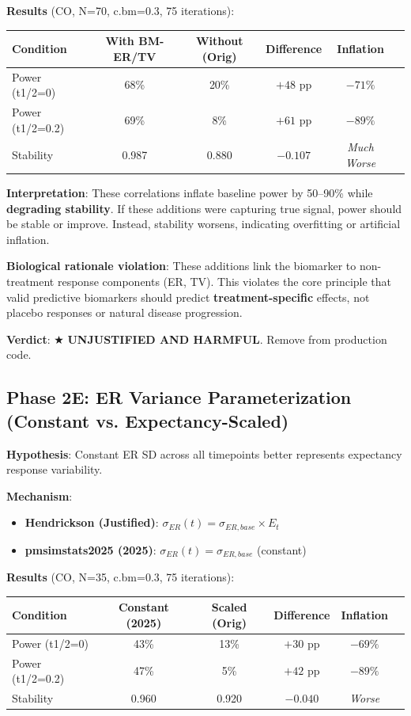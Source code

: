\documentclass[12pt,a4paper]{article}
\begin{document}
\textbf{Results} (CO, N=70, c.bm=0.3, 75 iterations):

\begin{center}
\begin{tabular}{lccccc}
\toprule
\textbf{Condition} & \textbf{With BM-ER/TV} & \textbf{Without (Orig)} & \textbf{Difference} & \textbf{Inflation} \\
\midrule
Power (t1/2=0) & 68\% & 20\% & $+48$ pp & $-71\%$ \\
Power (t1/2=0.2) & 69\% & 8\% & $+61$ pp & $-89\%$ \\
Stability & 0.987 & 0.880 & $-0.107$ & \textit{Much Worse} \\
\bottomrule
\end{tabular}
\end{center}

\textbf{Interpretation}: These correlations inflate baseline power by 50--90\% while \textbf{degrading stability}. If these additions were capturing true signal, power should be stable or improve. Instead, stability worsens, indicating overfitting or artificial inflation.

\textbf{Biological rationale violation}: These additions link the biomarker to non-treatment response components (ER, TV). This violates the core principle that valid predictive biomarkers should predict \textbf{treatment-specific} effects, not placebo responses or natural disease progression.

\textbf{Verdict}: \(\bigstar\) \textbf{UNJUSTIFIED AND HARMFUL}. Remove from production code.

\subsection{Phase 2E: ER Variance Parameterization (Constant vs. Expectancy-Scaled)}

\textbf{Hypothesis}: Constant ER SD across all timepoints better represents expectancy response variability.

\textbf{Mechanism}:
\begin{itemize}
\item \textbf{Hendrickson (Justified)}: $\sigma_{ER}(t) = \sigma_{ER,base} \times E_t$
\item \textbf{pmsimstats2025 (2025)}: $\sigma_{ER}(t) = \sigma_{ER,base}$ (constant)
\end{itemize}

\textbf{Results} (CO, N=35, c.bm=0.3, 75 iterations):

\begin{center}
\begin{tabular}{lccccc}
\toprule
\textbf{Condition} & \textbf{Constant (2025)} & \textbf{Scaled (Orig)} & \textbf{Difference} & \textbf{Inflation} \\
\midrule
Power (t1/2=0) & 43\% & 13\% & $+30$ pp & $-69\%$ \\
Power (t1/2=0.2) & 47\% & 5\% & $+42$ pp & $-89\%$ \\
Stability & 0.960 & 0.920 & $-0.040$ & \textit{Worse} \\
\bottomrule
\end{tabular}
\end{center}
\end{document}
